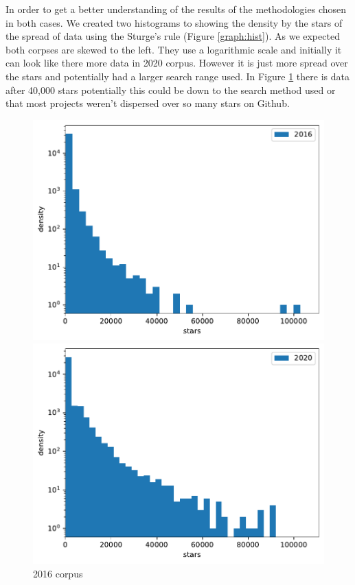 \documentclass[10pt,conference]{IEEEtran}
\begin{document}
In order to get a better understanding of the results of the methodologies chosen in both cases. We created two histograms to showing the density by the stars of the spread of data using the Sturge's rule (Figure \ref{graph:hist}). As we expected both corpses are skewed to the left. They use a logarithmic scale and initially it can look like there more data in 2020 corpus. However it is just more spread over the stars and potentially had a larger search range used. In Figure \ref{graph:hist2016} there is data after 40,000 stars potentially this could be down to the search method used or that most projects weren't dispersed over so many stars on Github.   

\begin{figure}[!htbp]
  \centering
  \begin{minipage}{.48\textwidth}
    \centering
    \includegraphics[width=\textwidth]{../src/results/density_2016.pdf}
    \caption[]{2016 corpus}
    \label{graph:hist2016}
  \end{minipage}
  \begin{minipage}{.48\textwidth}
    \centering
  \includegraphics[width=\textwidth]{../src/results/density_2020.pdf}

\end{minipage}
\end{figure}
\end{document}
